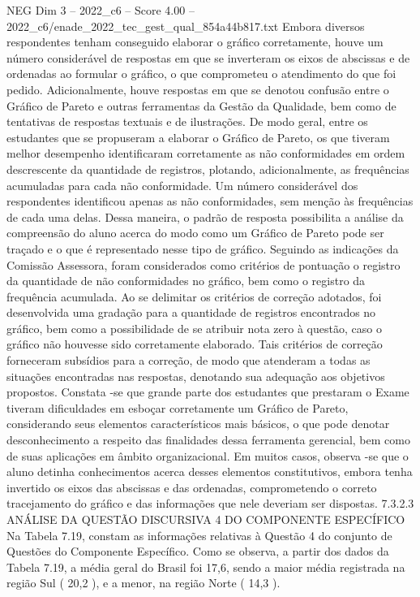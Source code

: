 \begin{textsample}{NEG Dim 3 – 2022\_c6 – Score 4.00 – 2022\_c6/enade\_2022\_tec\_gest\_qual\_854a44b817.txt}
Embora diversos respondentes tenham conseguido elaborar o gráfico corretamente, houve um número considerável de respostas em que se inverteram os eixos de abscissas e de ordenadas ao formular o gráfico, o que comprometeu o atendimento do que foi pedido.
Adicionalmente, houve respostas em que se denotou confusão entre o Gráfico de Pareto e outras ferramentas da Gestão da Qualidade, bem como de tentativas de respostas textuais e de ilustrações.
De modo geral, entre os estudantes que se propuseram a elaborar o Gráfico de Pareto, os que tiveram melhor desempenho identificaram corretamente as não conformidades em ordem descrescente da quantidade de registros, plotando, adicionalmente, as frequências acumuladas para cada não conformidade.
Um número considerável dos respondentes identificou apenas as não conformidades, sem menção às frequências de cada uma delas.
Dessa maneira, o padrão de resposta possibilita a análise da compreensão do aluno acerca do modo como um Gráfico de Pareto pode ser traçado e o que é representado nesse tipo de gráfico.
Seguindo as indicações da Comissão Assessora, foram considerados como critérios de pontuação o registro da quantidade de não conformidades no gráfico, bem como o registro da frequência acumulada.
Ao se delimitar os critérios de correção adotados, foi desenvolvida uma gradação para a quantidade de registros encontrados no gráfico, bem como a possibilidade de se atribuir nota zero à questão, caso o gráfico não houvesse sido corretamente elaborado.
Tais critérios de correção forneceram subsídios para a correção, de modo que atenderam a todas as situações encontradas nas respostas, denotando sua adequação aos objetivos propostos.
Constata -se que grande parte dos estudantes que prestaram o Exame tiveram dificuldades em esboçar corretamente um Gráfico de Pareto, considerando seus elementos característicos mais básicos, o que pode denotar desconhecimento a respeito das finalidades dessa ferramenta gerencial, bem como de suas aplicações em âmbito organizacional.
Em muitos casos, observa -se que o aluno detinha conhecimentos acerca desses elementos constitutivos, embora tenha invertido os eixos das abscissas e das ordenadas, comprometendo o correto tracejamento do gráfico e das informações que nele deveriam ser dispostas. 7.3.2.3 ANÁLISE DA QUESTÃO DISCURSIVA 4 DO COMPONENTE ESPECÍFICO Na Tabela 7.19, constam as informações relativas à Questão 4 do conjunto de Questões do Componente Específico.
Como se observa, a partir dos dados da Tabela 7.19, a média geral do Brasil foi 17,6, sendo a maior média registrada na região Sul ( 20,2 ), e a menor, na região Norte ( 14,3 ).

\end{textsample}
